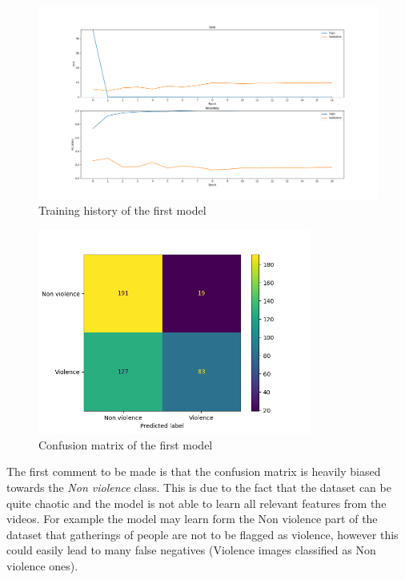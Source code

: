 \begin{figure}[]
    \centering
    \includegraphics[width=1\textwidth]{images/731a-simple3-b538-history.png}
    \caption{Training history of the first model}
    \label{fig:First2DCNNHistory}
\end{figure}

\begin{figure}[]
    \centering
    \includegraphics[width=0.8\textwidth]{images/731a-simple3-b538-conf_matrix.png}
    \caption{Confusion matrix of the first model}
    \label{fig:First2DCNNConfusionMatrix}
\end{figure}


The first comment to be made is that the confusion matrix is heavily biased towards the \textit{Non violence} class. This is due to the fact that the dataset can be quite chaotic and the model is not able to learn all relevant features from the videos. For example the model may learn form the Non violence part of the dataset that gatherings of people are not to be flagged as violence, however this could easily lead to many false negatives (Violence images classified as Non violence ones).

